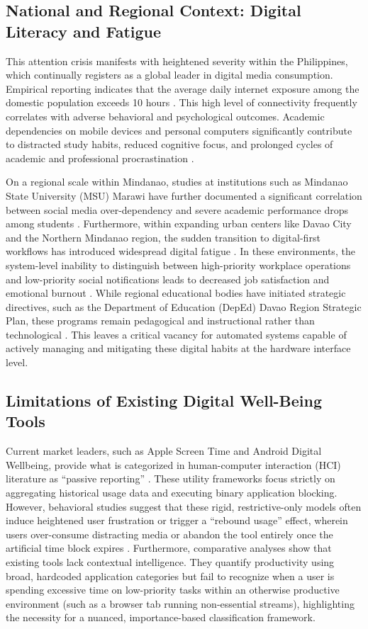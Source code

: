 \documentclass[conference]{IEEEtran}
\begin{document}
\subsection{National and Regional Context: Digital Literacy and Fatigue}
This attention crisis manifests with heightened severity within the Philippines, which continually registers as a global leader in digital media consumption. Empirical reporting indicates that the average daily internet exposure among the domestic population exceeds 10 hours \cite{Meltwater2025}. This high level of connectivity frequently correlates with adverse behavioral and psychological outcomes. Academic dependencies on mobile devices and personal computers significantly contribute to distracted study habits, reduced cognitive focus, and prolonged cycles of academic and professional procrastination \cite{Geranco2026, Geronimo2025, Vimala2025}. 

On a regional scale within Mindanao, studies at institutions such as Mindanao State University (MSU) Marawi have further documented a significant correlation between social media over-dependency and severe academic performance drops among students \cite{Tiking2024}. Furthermore, within expanding urban centers like Davao City and the Northern Mindanao region, the sudden transition to digital-first workflows has introduced widespread digital fatigue \cite{Tecson2026}. In these environments, the system-level inability to distinguish between high-priority workplace operations and low-priority social notifications leads to decreased job satisfaction and emotional burnout \cite{Tecson2026}. While regional educational bodies have initiated strategic directives, such as the Department of Education (DepEd) Davao Region Strategic Plan, these programs remain pedagogical and instructional rather than technological \cite{DepEdDavao2025}. This leaves a critical vacancy for automated systems capable of actively managing and mitigating these digital habits at the hardware interface level.

\subsection{Limitations of Existing Digital Well-Being Tools}
Current market leaders, such as Apple Screen Time and Android Digital Wellbeing, provide what is categorized in human-computer interaction (HCI) literature as ``passive reporting'' \cite{Abhari2022}. These utility frameworks focus strictly on aggregating historical usage data and executing binary application blocking. However, behavioral studies suggest that these rigid, restrictive-only models often induce heightened user frustration or trigger a ``rebound usage'' effect, wherein users over-consume distracting media or abandon the tool entirely once the artificial time block expires \cite{Mark2023, Lally2013}. Furthermore, comparative analyses show that existing tools lack contextual intelligence. They quantify productivity using broad, hardcoded application categories but fail to recognize when a user is spending excessive time on low-priority tasks within an otherwise productive environment (such as a browser tab running non-essential streams), highlighting the necessity for a nuanced, importance-based classification framework.
\end{document}
